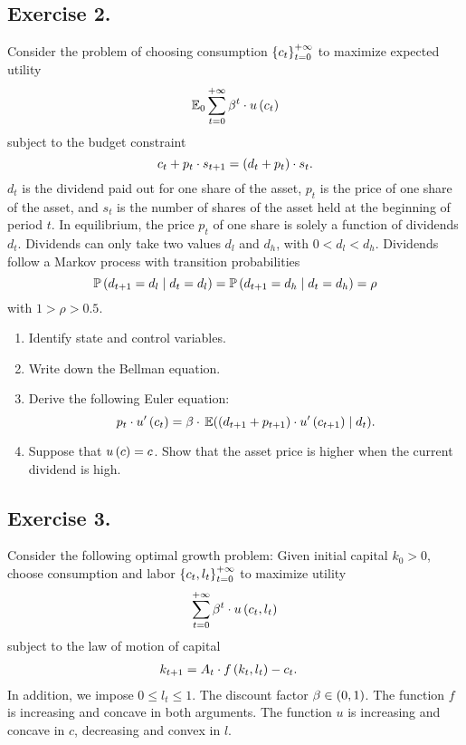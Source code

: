 \documentclass[letterpaper,12pt,leqno]{article}
\begin{document}
\subsection*{Exercise 2.}

Consider the problem of choosing consumption $\left\lbrace c_{t} \right\rbrace_{t=0}^{+\infty}$ to maximize expected utility
\begin{equation*}
\E_{0}\sum_{t=0}^{+\infty}\b^{t}\cdot u\bp{c_{t}}
\end{equation*}
subject to the budget constraint
\begin{equation*}
c_{t}+p_{t}\cdot s_{t+1}=\left( d_{t}+p_{t} \right)\cdot s_{t}.
\end{equation*}
$d_{t}$ is the dividend paid out for one share of the asset, $p_{t}$ is the price of one share of the asset, and $s_{t}$ is the number of shares of the asset held at the beginning of period $t$. In equilibrium, the price $p_{t}$ of one share is solely a function of dividends $d_{t}$. Dividends can only take two values $d_{l}$ and $d_{h}$, with $0<d_{l}<d_{h}$. Dividends follow a Markov process with transition probabilities 
\begin{equation*}
\P\bp{d_{t+1}=d_{l}\mid d_{t}=d_{l}} =\P \bp{d_{t+1}=d_{h}\mid d_{t}=d_{h}} =\rho
\end{equation*}
with $1>\rho >0.5.$

\begin{enumerate}
\item Identify state and control variables. 
\item Write down the Bellman equation.
\item Derive the following Euler equation: 
\begin{equation*}
p_{t}\cdot u'\bp{c_{t}} =\b\cdot  \E{\bp{d_{t+1}+p_{t+1}} \cdot u'\bp{c_{t+1}} \mid d_{t}} .
\end{equation*}

\item Suppose that $u\left( c \right) =c$. Show that the asset price is higher when the current dividend is high.
\end{enumerate}

\subsection*{Exercise 3.}

Consider the following optimal growth problem: Given initial capital $k_{0}>0$, choose consumption and labor $\left\lbrace c_{t},l_{t} \right\rbrace_{t=0}^{+\infty}$ to maximize utility
\begin{equation*}
\sum_{t=0}^{+\infty}\beta^{t}\cdot u\left( c_{t},l_{t} \right)
\end{equation*}
subject to the law of motion of capital
\begin{align*}
k_{t+1}&=A_{t}\cdot f\left( k_{t},l_{t} \right) -c_{t}.
\end{align*}
In addition, we impose $0\leq l_{t}\leq 1$. The discount factor $\beta \in \left( 0,1 \right) $. The function $f$ is increasing and concave in both arguments. The function $u$ is increasing and concave in $c$, decreasing and convex in $l$. 
\end{document}
